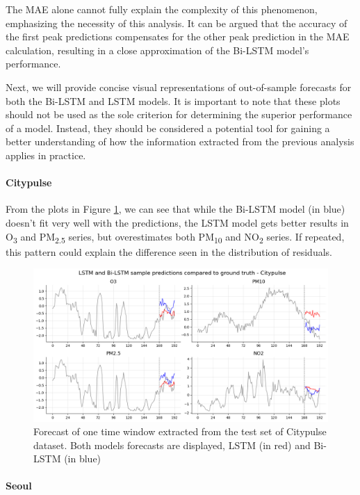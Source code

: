The MAE alone cannot fully explain the complexity of this phenomenon, emphasizing the necessity of this analysis. It can be argued that the accuracy of the first peak predictions compensates for the other peak prediction in the MAE calculation, resulting in a close approximation of the Bi-LSTM model's performance.

Next, we will provide concise visual representations of out-of-sample forecasts for both the Bi-LSTM and LSTM models. It is important to note that these plots should not be used as the sole criterion for determining the superior performance of a model. Instead, they should be considered a potential tool for gaining a better understanding of how the information extracted from the previous analysis applies in practice.

\paragraph{Citypulse}
From the plots in Figure \ref{fig:forecasts_aarhus}, we can see that while the Bi-LSTM model (in blue) doesn't fit very well with the predictions, the LSTM model gets better results in O\textsubscript{3} and PM\textsubscript{2.5} series, but overestimates both PM\textsubscript{10} and NO\textsubscript{2} series. If repeated, this pattern could explain the difference seen in the distribution of residuals.

\begin{figure}[h]
    \centering
    \includegraphics[width=1\linewidth]{images/forecasts_aarhus.png}
    \caption{Forecast of one time window extracted from the test set of Citypulse dataset. Both models forecasts are displayed, LSTM (in red) and Bi-LSTM (in blue)}
    \label{fig:forecasts_aarhus}
\end{figure}

\paragraph{Seoul}

